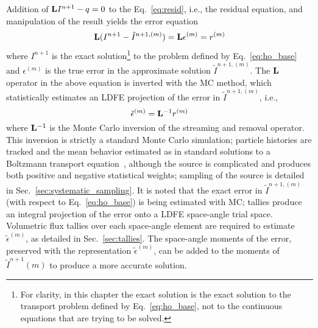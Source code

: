 Addition of $\mathbf{L} I^{n+1} - q=0$ to the Eq.~\eqref{eq:resid}, i.e., the residual equation,
and manipulation of the result yields the error equation
\begin{equation}\label{eq:err_eq}
    \mathbf{L} (I^{n+1} - \tilde{I}^{n+1,(m)}) = \mathbf{L} {\epsilon}^{(m)} = r^{(m)}
\end{equation}
where $I^{n+1}$ is the exact solution\footnote{For clarity, in this chapter the exact solution is the
    exact solution to the transport problem defined by Eq.~\eqref{eq:ho_base}, not to the
continuous equations that are trying to be solved.}  to the problem defined by Eq.~\eqref{eq:ho_base} and
${\epsilon}^{(m)}$ is the true error in the approximate solution $\tilde{I}^{n+1,(m)}$. 
The $\mathbf{L}$ operator in the above equation is inverted with the MC method, which
statistically estimates an LDFE projection of the error in $\tilde{I}^{n+1,(m)}$, i.e., 
\begin{equation}\label{eq:mc_err}
\tilde{\epsilon}^{(m)} = \mathbf{L}^{-1} r^{(m)}
\end{equation}
where $\mathbf{L}^{-1}$ is the Monte Carlo inversion of the streaming and removal operator.  
This inversion is strictly a standard Monte Carlo simulation; particle histories are
tracked and the mean behavior estimated as in standard solutions to a Boltzmann transport
equation~\cite{shultis_mc,mcnp}, although the source is
complicated and produces both positive and negative statistical weights; sampling of the
source is detailed in Sec.~\ref{sec:systematic_sampling}.  
It is noted that the exact error in $\tilde{I}^{n+1,(m)}$ (with respect to
Eq.~\eqref{eq:ho_base}) is being estimated with MC;
tallies produce an integral projection of the error onto a LDFE space-angle trial space. 
Volumetric flux tallies over each space-angle element are required to estimate
$\tilde{\epsilon}^{(m)}$, as detailed in Sec.~\ref{sec:tallies}.  
The
space-angle moments of the error, preserved with the representation $\tilde{\epsilon}^{(m)}$, can be added to the
moments of $\tilde{I}^{n+1}(m)$ to produce a more accurate solution.  

